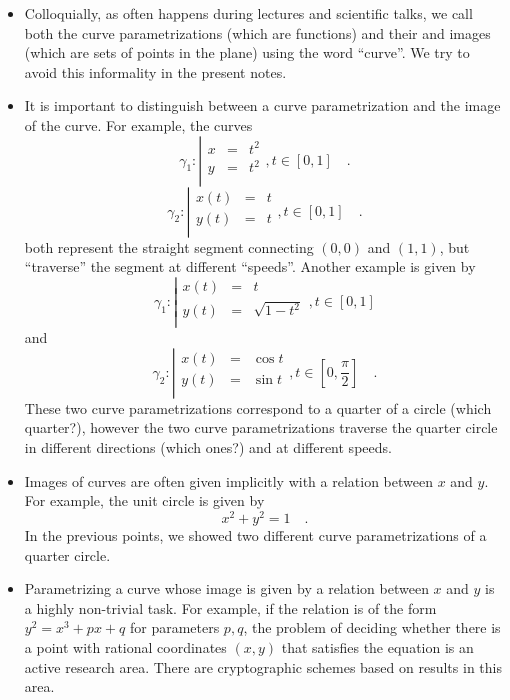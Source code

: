 \documentclass[12pt]{book}
\begin{document}
\begin{itemize}
\item  Colloquially, as often happens during lectures and scientific talks, we call both the curve parametrizations (which are functions) and their  and images (which are sets of points in the plane) using the word ``curve''. We try to avoid this informality in the present notes.
\item It is important to distinguish between a curve parametrization and the image of the curve. For example, the curves 
\[
\gamma_1:\left| 
\begin{array}{rcl}
x&=&t^2\\
y&=&t^2\\
\end{array}\right., t\in [0,1]\quad .
\]
\[\gamma_2:\left| 
\begin{array}{rcl}
x(t)&=&t\\
y(t)&=&t\\
\end{array}\right., t\in [0,1]\quad .
\]
both represent the straight segment connecting $(0,0)$ and $(1,1)$, but ``traverse'' the segment at different ``speeds''. Another example is given by
\[
\gamma_1:\left| 
\begin{array}{rcl}
x(t)&=&t\\
y(t)&=&\sqrt{1-t^2}\\
\end{array}\right., t\in [0,1]
\]
and 
\[
\gamma_2:\left| 
\begin{array}{rcl}
x(t)&=&\cos t\\
y(t)&=&\sin t\\
\end{array}\right., t\in [0, \frac{\pi}{2}]\quad .
\]
These two curve parametrizations correspond to a quarter of a circle (which quarter?), however the two curve parametrizations traverse the quarter circle in different directions (which ones?) and at different speeds. 
\item Images of curves are often given implicitly with a relation between $x$ and $y$. For example, the unit circle is given by 
\[
x^2+y^2=1\quad .
\]
In the previous points, we showed two different curve parametrizations of a quarter circle.
\item Parametrizing a curve whose image is given by a relation between $x$ and $y$ is a highly non-trivial task. For example, if the relation is of the form $y^2=x^3+px+q$ for parameters $p,q$, the problem of deciding whether there is a point with rational coordinates $(x,y)$ that satisfies the equation is an active research area. There are cryptographic schemes based on results in this area.


\end{itemize}
\end{document}
